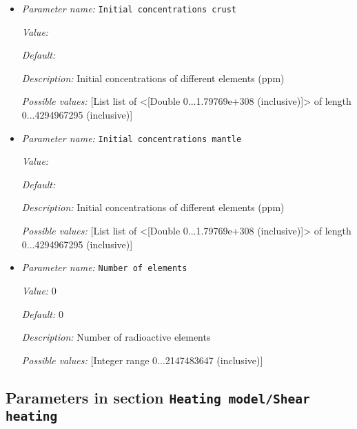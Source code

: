 \begin{itemize}
{\it Value:} 


{\it Default:} 


{\it Description:} Heating rates of different elements (W/kg)


{\it Possible values:} [List list of <[Double -1.79769e+308...1.79769e+308 (inclusive)]> of length 0...4294967295 (inclusive)]
\item {\it Parameter name:} {\tt Initial concentrations crust}
\label{parameters:Heating model/Radioactive decay/Initial concentrations crust}


{\it Value:} 


{\it Default:} 


{\it Description:} Initial concentrations of different elements (ppm)


{\it Possible values:} [List list of <[Double 0...1.79769e+308 (inclusive)]> of length 0...4294967295 (inclusive)]
\item {\it Parameter name:} {\tt Initial concentrations mantle}
\label{parameters:Heating model/Radioactive decay/Initial concentrations mantle}


{\it Value:} 


{\it Default:} 


{\it Description:} Initial concentrations of different elements (ppm)


{\it Possible values:} [List list of <[Double 0...1.79769e+308 (inclusive)]> of length 0...4294967295 (inclusive)]
\item {\it Parameter name:} {\tt Number of elements}
\label{parameters:Heating model/Radioactive decay/Number of elements}


{\it Value:} 0


{\it Default:} 0


{\it Description:} Number of radioactive elements


{\it Possible values:} [Integer range 0...2147483647 (inclusive)]
\end{itemize}

\subsection{Parameters in section \tt Heating model/Shear heating}
\label{parameters:Heating_20model/Shear_20heating}


